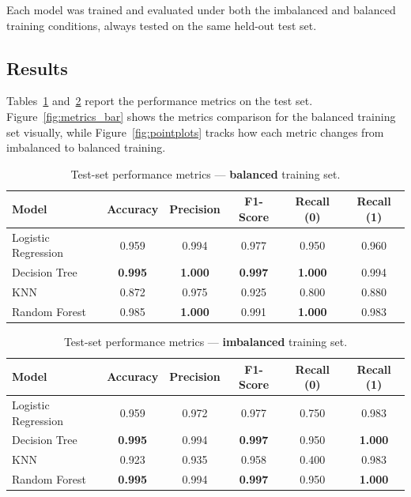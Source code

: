 \documentclass[12pt, a4paper]{article}
\begin{document}
Each model was trained and evaluated under both the imbalanced and balanced
training conditions, always tested on the same held-out test set.

\subsection{Results}

Tables~\ref{tab:metrics_bal} and~\ref{tab:metrics_imb} report the performance
metrics on the test set. Figure~\ref{fig:metrics_bar} shows the metrics
comparison for the balanced training set visually, while
Figure~\ref{fig:pointplots} tracks how each metric changes from imbalanced to
balanced training.

\begin{table}[H]
\centering
\caption{Test-set performance metrics --- \textbf{balanced} training set.}
\label{tab:metrics_bal}
\renewcommand{\arraystretch}{1.3}
\begin{tabular}{lccccc}
\toprule
\textbf{Model} & \textbf{Accuracy} & \textbf{Precision} & \textbf{F1-Score}
               & \textbf{Recall (0)} & \textbf{Recall (1)} \\
\midrule
Logistic Regression & 0.959 & 0.994 & 0.977 & 0.950 & 0.960 \\
Decision Tree       & \textbf{0.995} & \textbf{1.000} & \textbf{0.997} & \textbf{1.000} & 0.994 \\
KNN                 & 0.872 & 0.975 & 0.925 & 0.800 & 0.880 \\
Random Forest       & 0.985 & \textbf{1.000} & 0.991 & \textbf{1.000} & 0.983 \\
\bottomrule
\end{tabular}
\end{table}

\begin{table}[H]
\centering
\caption{Test-set performance metrics --- \textbf{imbalanced} training set.}
\label{tab:metrics_imb}
\renewcommand{\arraystretch}{1.3}
\begin{tabular}{lccccc}
\toprule
\textbf{Model} & \textbf{Accuracy} & \textbf{Precision} & \textbf{F1-Score}
               & \textbf{Recall (0)} & \textbf{Recall (1)} \\
\midrule
Logistic Regression & 0.959 & 0.972 & 0.977 & 0.750 & 0.983 \\
Decision Tree       & \textbf{0.995} & 0.994 & \textbf{0.997} & 0.950 & \textbf{1.000} \\
KNN                 & 0.923 & 0.935 & 0.958 & 0.400 & 0.983 \\
Random Forest       & \textbf{0.995} & 0.994 & \textbf{0.997} & 0.950 & \textbf{1.000} \\
\bottomrule
\end{tabular}
\end{table}
\end{document}

